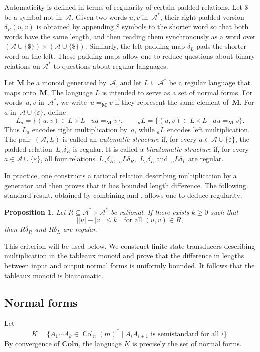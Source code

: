 \documentclass[a4paper, twoside, 11pt, english]{article}
\theoremstyle{plain}
\newtheorem{proposition}[subsubsection]{Proposition}
\theoremstyle{definition}
\DeclareMathOperator{\col}{Col}
\newcommand{\Ar}{\EuScript{A}}
\newcommand{\M}{\mathbf{M}}
\newcommand{\Colo}{\mathbf{Coln}}
\def\Ar{\mathcal{A}}
\begin{document}
Automaticity is defined in terms of regularity of certain padded relations.
Let $\$$ be a symbol not in~$\Ar$.
Given two words $u,v$ in~$\Ar^*$,
their right-padded version $\delta_R(u,v)$
is obtained by appending $\$$ symbols to the shorter word
so that both words have the same length,
and then reading them synchronously as a word over
$(\Ar\cup\{\$\})\times(\Ar\cup\{\$\})$.
Similarly, the left padding map $\delta_L$
pads the shorter word on the left.
These padding maps allow one to reduce questions about
binary relations on $\Ar^*$ to questions about regular languages.


Let $\M$ be a monoid generated by~$\Ar$,
and let $L\subseteq\Ar^*$ be a regular language
that maps onto~$\M$.
The language $L$ is intended to serve as a set of normal forms.
For words~$u,v$ in~$\Ar^*$, we write~$u=_\M v$ if they
represent the same element of~$\M$.
For $a$ in~$\Ar\cup\{\varepsilon\}$, define
\[
L_a=\{(u,v)\in L\times L \mid ua=_\M v\},
\qquad
{}_aL=\{(u,v)\in L\times L \mid au=_\M v\}.
\]
Thus $L_a$ encodes right multiplication by~$a$,
while ${}_aL$ encodes left multiplication.
The pair~$(\Ar,L)$ is called an \emph{automatic structure} if, for every
$a\in\Ar\cup\{\varepsilon\}$, the padded relation~$L_a\delta_R$ is regular.
It is called a \emph{biautomatic structure} if, for every
$a\in\Ar\cup\{\varepsilon\}$, all four relations~$L_a\delta_R$,~${}_aL\delta_R$,~$
L_a\delta_L$ and~${}_aL\delta_L$ are regular.

In practice, one constructs a rational relation describing
multiplication by a generator and then proves that it has bounded
length difference.
The following standard result, obtained by combining
\cite[Corollary~2.5]{FS93} and \cite[Proposition~4]{HT05},
allows one to deduce regularity:

\begin{proposition}
\label{prop:rational-to-regular}
Let $R\subseteq \Ar^*\times\Ar^*$ be rational.
If there exists $k\ge0$ such that
\[
\bigl||u|-|v|\bigr| \le k
\quad\text{for all } (u,v)\in R,
\]
then $R\delta_R$ and $R\delta_L$ are regular.
\end{proposition}

This criterion will be used below.
We construct finite-state transducers describing multiplication
in the tableaux monoid and prove that the difference in lengths
between input and output normal forms is uniformly bounded.
It follows that the tableaux monoid is biautomatic.

\subsection{Normal forms}
Let
\[
K=\{A_1\cdots A_k\in \col_n(m)^*
\mid A_iA_{i+1}\text{ is semistandard for all }i\}.
\]
By convergence of $\Colo$,
the language $K$ is precisely the set of normal forms.
\end{document}
